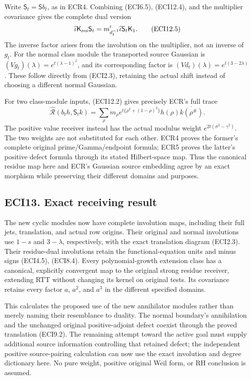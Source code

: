 Write \(\mathsf S_t=\mathsf S b_t\), as in ECR4. Combining (ECI6.5),
(ECI12.4), and the multiplier covariance gives the complete dual version
\[
\widehat\iota\mathsf K_{\rm res}\mathsf S_t
=m_{d_t^{-1}}'\widehat\iota\mathsf S_t\mathsf K_1.
\tag{ECI12.5}
\] The inverse factor arises from the involution on the multiplier, not
an inverse of \(g_t\). For the normal class module the transported
source Gaussian is \((Vg_t)(\lambda)=e^{t(\lambda-1)^2}\), and its
corresponding factor is \((Vd_t)(\lambda)=e^{t(3-2\lambda)}\). These
follow directly from (ECI2.3), retaining the actual shift instead of
choosing a different normal Gaussian.

For two class-module inputs, (ECI12.2) gives precisely ECR's full trace
\[
\widehat{\mathcal R}(b_th,\mathsf S_tk)
=\sum_\rho m_\rho e^{t\{\rho^2+(1-\rho)^2\}}
h(\rho)\overline{k(\rho^\#)}.
\tag{ECI12.6}
\] The positive value receiver instead has the actual modulus weight
\(e^{2t(\sigma^2-\gamma^2)}\). The two weights are not substituted for
each other. ECR4 proves the former's complete original
prime/Gamma/endpoint formula; ECR5 proves the latter's positive defect
formula through its stated Hilbert-space map. Thus the canonical residue
map here and ECR's Gaussian source embedding agree by an exact morphism
while preserving their different domains and purposes.

\subsection{ECI13. Exact receiving
result}\label{eci13.-exact-receiving-result}

The new cyclic modules now have complete involution maps, including
their full jets, translation, and actual row origins. Their original and
normal involutions use \(1-s\) and \(3-\lambda\), respectively, with the
exact translation diagram (ECI2.3). Their residue-dual involutions
retain the functional-equation units and minus signs (ECI4.5), (ECI8.4).
Every polynomial-growth extension class has a canonical, explicitly
convergent map to the original strong residue receiver, extending RTT
without changing its kernel on original tests. Its covariance retains
every factor \(a\), \(a^2\), and \(a^3\) in the different specified
domains.

This calculates the proposed use of the new annihilator modules rather
than merely naming their resemblance to duality. The normal boundary's
annihilation and the unchanged original positive-adjoint defect coexist
through the proved translation (ECI9.2). The remaining attempt toward
the active goal must supply additional source information controlling
that retained defect; the independent positive source-pairing
calculation can now use the exact involution and degree dictionary here.
No pure weight, positive original Weil form, or RH conclusion is
assumed.

